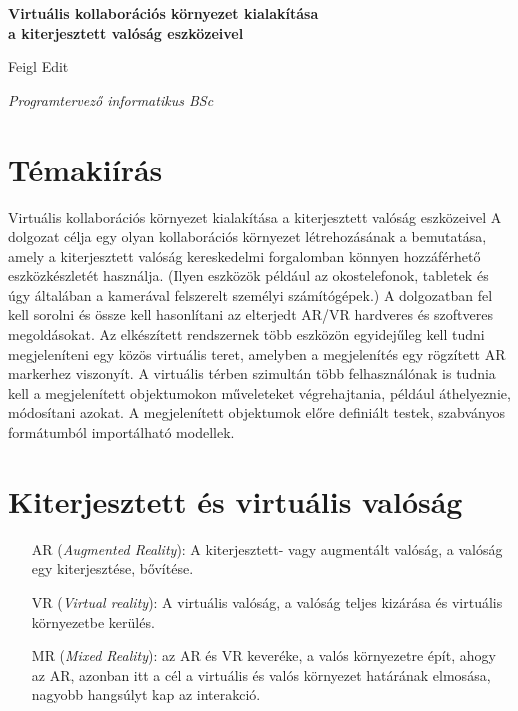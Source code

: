 \documentclass[a4paper,12pt]{article}
\begin{document}
\begin{center}
   \Large \textbf{Virtuális kollaborációs környezet kialakítása \\ a kiterjesztett valóság eszközeivel}
   
   \vskip 5mm
   
   \huge Feigl Edit

   \smallskip
   
   \Large \textit{Programtervező informatikus BSc}
\end{center}

\vskip 1cm

\tableofcontents

\pagebreak

\section*{Témakiírás}

Virtuális kollaborációs környezet kialakítása a kiterjesztett valóság eszközeivel A dolgozat célja egy olyan kollaborációs környezet létrehozásának a bemutatása, amely a kiterjesztett valóság kereskedelmi forgalomban könnyen hozzáférhető eszközkészletét használja. (Ilyen eszközök például az okostelefonok, tabletek és úgy általában a kamerával felszerelt személyi számítógépek.) A dolgozatban fel kell sorolni és össze kell hasonlítani az elterjedt AR/VR hardveres és szoftveres megoldásokat. Az elkészített rendszernek több eszközön egyidejűleg kell tudni megjeleníteni egy közös virtuális teret, amelyben a megjelenítés egy rögzített AR markerhez viszonyít. A virtuális térben szimultán több felhasználónak is tudnia kell a megjelenített objektumokon műveleteket végrehajtania, például áthelyeznie, módosítani azokat. A megjelenített objektumok előre definiált testek, szabványos formátumból importálható modellek.

\section{Kiterjesztett és virtuális valóság}

\begin{itemize}
\item[AR] (\textit{Augmented Reality}): A kiterjesztett- vagy augmentált valóság, a valóság egy kiterjesztése, bővítése. 
\item[VR] (\textit{Virtual reality}): A virtuális valóság, a valóság teljes kizárása és virtuális környezetbe kerülés.
\item[MR] (\textit{Mixed Reality}): az AR és VR keveréke, a valós környezetre épít, ahogy az AR, azonban itt a cél a virtuális és valós környezet határának elmosása, nagyobb hangsúlyt kap az interakció. 
\end{itemize}
\end{document}

